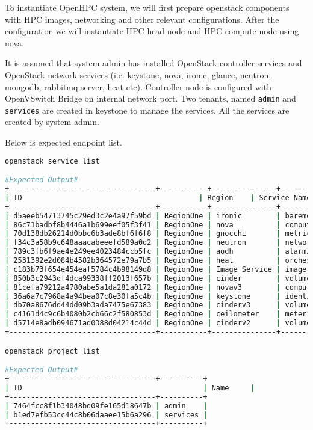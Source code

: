 To instantiate OpenHPC system, we will first prepare openstack components with HPC images, networking and other relevant configurations. After the configuration we will instantiate HPC head node and HPC compute node using nova. 

It is assumed that system admin has installed OpenStack controller services and OpenStack network services (i.e. keystone, nova, ironic, glance, neutron, mongodb, rabbitmq server, heat etc). 
Controller node is configured with OpenVSwitch Bridge on internal network port. 
Two tenants, named \texttt{admin} and \texttt{services} are created in keystone to manage the services. All the services are created by system admin. 

Below is expected endpoint list.

\begin{lstlisting}[language=bash,keywords={}]
openstack service list

#Expected Output#
+----------------------------------+-----------+---------------+---------------+
| ID                                         | Region    | Service Name  | Service Type  |
+----------------------------------+-----------+---------------+---------------+
| d5aeeb54713745c29ed3c2e4a97f59bd | RegionOne | ironic        | baremetal     |
| 86c71badbf8b4446a1b699eef05f3f41 | RegionOne | nova          | compute       |
| 70d138db26214d0bbc6b3ade8bf6f6f8 | RegionOne | gnocchi       | metric        |
| f34c3a58b9c648aaacabeeefd589a0d2 | RegionOne | neutron       | network       |
| 789c3fb6f9ae4e249ee4023484ccb5fc | RegionOne | aodh          | alarming      |
| 2531392e2d084b4582b364572e79a7b5 | RegionOne | heat          | orchestration |
| c183b73f654e454eaf5784c4b98149d8 | RegionOne | Image Service | image         |
| 850b3c2943df4dca99338ff2013f657b | RegionOne | cinder        | volume        |
| 81cefa79212a4780abe5a1da281a0172 | RegionOne | novav3        | computev3     |
| 36a6a7c7968a4a94bea07c8e30fa5c4b | RegionOne | keystone      | identity      |
| db70a8676dd44dd09b3ada7475e67383 | RegionOne | cinderv3      | volumev3      |
| c4161d4c9c6b4080b2cb66c2f580853d | RegionOne | ceilometer    | metering      |
| d5714e8adb094671ad0388d04214c44d | RegionOne | cinderv2      | volumev2      |
+----------------------------------+-----------+---------------+---------------+

openstack project list

#Expected Output#
+----------------------------------+----------+
| ID                                          | Name     |
+----------------------------------+----------+
| 7464fcc8f1b34048bd09fe165d18647b | admin    |
| b1ed7efb53cc44c8b06daaee15b6a296 | services |
+----------------------------------+----------+
\end{lstlisting}


